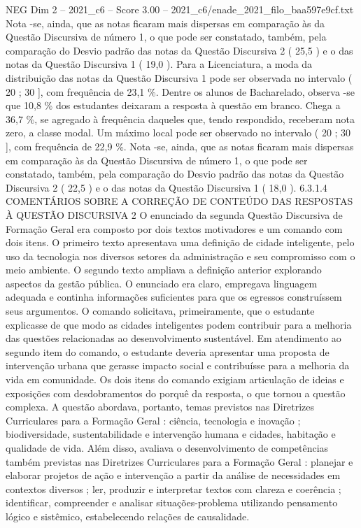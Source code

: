 \begin{textsample}{NEG Dim 2 – 2021\_c6 – Score 3.00 – 2021\_c6/enade\_2021\_filo\_baa597e9cf.txt}
Nota -se, ainda, que as notas ficaram mais dispersas em comparação às da Questão Discursiva de número 1, o que pode ser constatado, também, pela comparação do Desvio padrão das notas da Questão Discursiva 2 ( 25,5 ) e o das notas da Questão Discursiva 1 ( 19,0 ).
Para a Licenciatura, a moda da distribuição das notas da Questão Discursiva 1 pode ser observada no intervalo ( 20 ; 30 ], com frequência de 23,1 \%.
Dentre os alunos de Bacharelado, observa -se que 10,8 \% dos estudantes deixaram a resposta à questão em branco.
Chega a 36,7 \%, se agregado à frequência daqueles que, tendo respondido, receberam nota zero, a classe modal.
Um máximo local pode ser observado no intervalo ( 20 ; 30 ], com frequência de 22,9 \%.
Nota -se, ainda, que as notas ficaram mais dispersas em comparação às da Questão Discursiva de número 1, o que pode ser constatado, também, pela comparação do Desvio padrão das notas da Questão Discursiva 2 ( 22,5 ) e o das notas da Questão Discursiva 1 ( 18,0 ). 6.3.1.4 COMENTÁRIOS SOBRE A CORREÇÃO DE CONTEÚDO DAS RESPOSTAS À QUESTÃO DISCURSIVA 2 O enunciado da segunda Questão Discursiva de Formação Geral era composto por dois textos motivadores e um comando com dois itens.
O primeiro texto apresentava uma definição de cidade inteligente, pelo uso da tecnologia nos diversos setores da administração e seu compromisso com o meio ambiente.
O segundo texto ampliava a definição anterior explorando aspectos da gestão pública.
O enunciado era claro, empregava linguagem adequada e continha informações suficientes para que os egressos construíssem seus argumentos.
O comando solicitava, primeiramente, que o estudante explicasse de que modo as cidades inteligentes podem contribuir para a melhoria das questões relacionadas ao desenvolvimento sustentável.
Em atendimento ao segundo item do comando, o estudante deveria apresentar uma proposta de intervenção urbana que gerasse impacto social e contribuísse para a melhoria da vida em comunidade.
Os dois itens do comando exigiam articulação de ideias e exposições com desdobramentos do porquê da resposta, o que tornou a questão complexa.
A questão abordava, portanto, temas previstos nas Diretrizes Curriculares para a Formação Geral : ciência, tecnologia e inovação ; biodiversidade, sustentabilidade e intervenção humana e cidades, habitação e qualidade de vida.
Além disso, avaliava o desenvolvimento de competências também previstas nas Diretrizes Curriculares para a Formação Geral : planejar e elaborar projetos de ação e intervenção a partir da análise de necessidades em contextos diversos ; ler, produzir e interpretar textos com clareza e coerência ; identificar, compreender e analisar situações-problema utilizando pensamento lógico e sistêmico, estabelecendo relações de causalidade.

\end{textsample}
